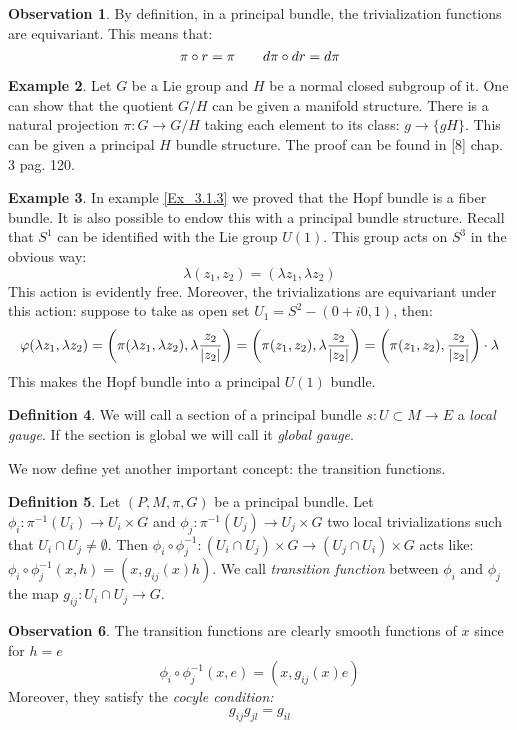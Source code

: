\documentclass[12pt,a4paper]{report}
\theoremstyle{definition}
\newtheorem{Def}{Definition}[chapter]
\theoremstyle{Theorem}
\theoremstyle{definition}
\newtheorem{Ex}[Def]{Example}
\theoremstyle{definition}
\newtheorem{Obs}[Def]{Observation}
\begin{document}
	\begin{Obs} \label{Obs_3.5.1}
		By definition, in a principal bundle, the trivialization functions are equivariant. This means that:
		$$\pi\circ r=\pi\hspace{20 pt}d\pi\circ dr=d\pi$$
	\end{Obs}
	\begin{Ex}
		Let $G$ be a Lie group and $H$ be a normal closed subgroup of it. One can show that the quotient $G/H$ can be given a manifold structure.
		There is a natural projection $\pi:G\rightarrow G/H$ taking each element to its class: $g\rightarrow \{gH\}$. This can be given a principal $H$ bundle structure. The proof can be found in [8] chap. 3 pag. 120.
	\end{Ex}
	\begin{Ex}
		In example \ref{Ex_3.1.3} we proved that the Hopf bundle is a fiber bundle. It is also possible to endow this with a principal bundle structure. Recall that $S^1$ can be identified with the Lie group $U(1)$. This group acts on $S^3$ in the obvious way:
		$$\lambda(z_1,z_2)=(\lambda z_1,\lambda z_2)$$
		This action is evidently free. Moreover, the trivializations are equivariant under this action: suppose to take as open set $U_1=S^2-(0+i0,1)$, then:
		$$\varphi(\lambda z_1,\lambda z_2)=\bigg(\pi(\lambda z_1,\lambda
		z_2),\lambda{z_2\over |z_2|}\bigg)=\bigg(\pi(z_1,	z_2),\lambda{z_2\over |z_2|}\bigg)=\bigg(\pi(z_1,	z_2),{z_2\over |z_2|}\bigg)\cdot \lambda$$
		This makes the Hopf bundle into a principal $U(1)$ bundle.
	\end{Ex}
	\begin{Def}
		We will call a section of a principal bundle $s:U\subset M\rightarrow E$ a \textit{local gauge}. If the section is global we will call it \textit{global gauge}.
	\end{Def}
	We now define yet another important concept: the transition functions.
	\begin{Def}
		Let $(P,M,\pi,G)$ be a principal bundle. Let $\phi_i:\pi^{-1}(U_i)\rightarrow U_i\times G$ and $\phi_j:\pi^{-1}(U_j)\rightarrow U_j\times G$ two local trivializations such that $U_i\cap U_j\neq\emptyset$. Then $\phi_i\circ\phi^{-1}_j:(U_i\cap U_j)\times G\rightarrow (U_j\cap U_i)\times G$ acts like: $\phi_i\circ\phi^{-1}_j(x,h)=(x,g_{ij}(x)h)$. We call \textit{transition function} between $\phi_i$ and $\phi_j$ the map $g_{ij}:U_i\cap U_j\rightarrow G$. 
	\end{Def}
	\begin{Obs}\label{Obs_3.5.2}
		The transition functions are clearly smooth functions of $x$ since for $h=e$
		$$\phi_i\circ\phi^{-1}_j(x,e)=(x,g_{ij}(x)e)$$
		Moreover, they satisfy the \textit{cocyle condition:}
		$$g_{ij}g_{jl}=g_{il}$$
	\end{Obs}
\end{document}
